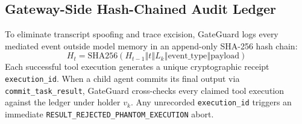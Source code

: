 \documentclass[10pt,twocolumn,a4paper]{article}
\begin{document}
\subsection{Gateway-Side Hash-Chained Audit Ledger}
To eliminate transcript spoofing and trace excision, GateGuard logs every mediated event outside model memory in an append-only SHA-256 hash chain:
\begin{equation}
    H_t = \text{SHA256}(H_{t-1} \mathbin{\Vert} t \mathbin{\Vert} L_k \mathbin{\Vert} \text{event\_type} \mathbin{\Vert} \text{payload})
\end{equation}
Each successful tool execution generates a unique cryptographic receipt \texttt{execution\_id}. When a child agent commits its final output via \texttt{commit\_task\_result}, GateGuard cross-checks every claimed tool execution against the ledger under holder $v_k$. Any unrecorded \texttt{execution\_id} triggers an immediate \texttt{RESULT\_REJECTED\_PHANTOM\_EXECUTION} abort.
\end{document}
